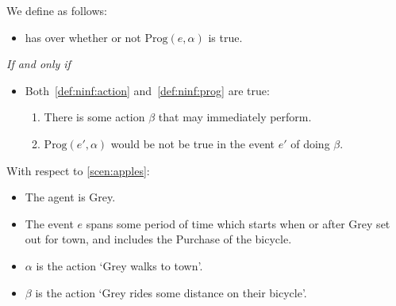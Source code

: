 \begin{note}
  We define \ninf{} as follows:
  \begin{definition}[\ninf{2}]
    \label{def:ninf}

    \begin{itemize}
    \item
      \vAgent{} has \ninf{} over whether or not \(\text{Prog}(e, \alpha)\) is true.
    \end{itemize}

    \emph{If and only if}

    \begin{itemize}
    \item
      Both~\ref{def:ninf:action} and~\ref{def:ninf:prog} are true:
      \begin{enumerate}[label=\alph*., ref=(\alph*)]
      \item
        \label{def:ninf:action}
        There is some action \(\beta\) that \vAgent{} may immediately perform.
      \item
        \label{def:ninf:prog}
        \(\text{Prog}(e', \alpha)\) would be not be true in the event \(e'\) of \vAgent{} doing \(\beta\).
      \end{enumerate}
    \end{itemize}
    \vspace{-\baselineskip}
  \end{definition}

  With respect to \autoref{scen:apples}:

  \begin{itemize}[noitemsep]
  \item
    The agent is Grey.
  \item
    The event \(e\) spans some period of time which starts when or after Grey set out for town, and includes the Purchase of the bicycle.
  \item
    \(\alpha\) is the action `Grey walks to town'.
  \item
    \(\beta\) is the action `Grey rides some distance on their bicycle'.
  \end{itemize}
\end{note}


